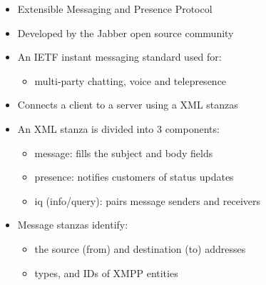 \begin{itemize}
	\item Extensible Messaging and Presence Protocol
	\item Developed by the Jabber open source community
	\item An IETF instant messaging standard used for:
		\begin{itemize}
			\item multi-party chatting, voice and telepresence
		\end{itemize}
	\item Connects a client to a server using a XML stanzas
	\item An XML stanza is divided into 3 components:
		\begin{itemize}
			\item message: fills the subject and body fields
			\item presence: notifies customers of status updates
			\item iq (info/query): pairs message senders and receivers
		\end{itemize}
	\item Message stanzas identify:
		\begin{itemize}
			\item the source (from) and destination (to) addresses
			\item types, and IDs of XMPP entities
		\end{itemize}
	\end{itemize}

